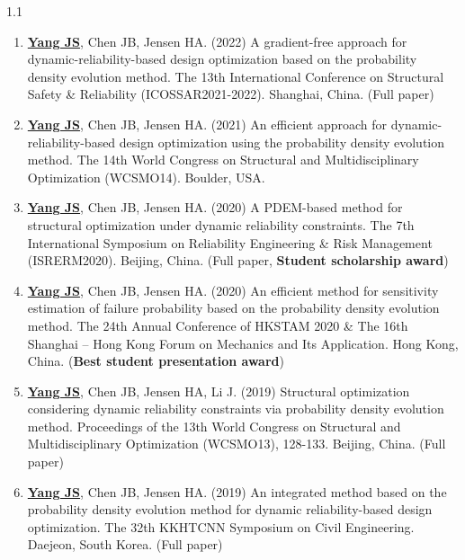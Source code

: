 \documentclass{resume}
\begin{document}
\begin{spacing}{1.1}
\begin{enumerate}[itemsep=3pt,topsep=2pt]
  \item \underline{\textbf{Yang JS}}, Chen JB, Jensen HA. (2022) A gradient-free approach for dynamic-reliability-based design optimization based on the probability density evolution method. The 13th International Conference on Structural Safety \& Reliability (ICOSSAR2021-2022). Shanghai, China. (Full paper)

  \item \underline{\textbf{Yang JS}}, Chen JB, Jensen HA. (2021) An efficient approach for dynamic-reliability-based design optimization using the probability density evolution method. The 14th World Congress on Structural and Multidisciplinary Optimization (WCSMO14). Boulder, USA.
  
  \item \underline{\textbf{Yang JS}}, Chen JB, Jensen HA. (2020) A PDEM-based method for structural optimization under dynamic reliability constraints. The 7th International Symposium on Reliability Engineering \& Risk Management (ISRERM2020). Beijing, China. (Full paper, \textbf{Student scholarship award})
  
  \item \underline{\textbf{Yang JS}}, Chen JB, Jensen HA. (2020) An efficient method for sensitivity estimation of failure probability based on the probability density evolution method. The 24th Annual Conference of HKSTAM 2020 \& The 16th Shanghai – Hong Kong Forum on Mechanics and Its Application. Hong Kong, China. (\textbf{Best student presentation award})
    
  \item \underline{\textbf{Yang JS}}, Chen JB, Jensen HA, Li J. (2019) Structural optimization considering dynamic reliability constraints via probability density evolution method. Proceedings of the 13th World Congress on Structural and Multidisciplinary Optimization (WCSMO13), 128-133. Beijing, China. (Full paper)
  
  \item \underline{\textbf{Yang JS}}, Chen JB, Jensen HA. (2019) An integrated method based on the probability density evolution method for dynamic reliability-based design optimization. The 32th KKHTCNN Symposium on Civil Engineering. Daejeon, South Korea. (Full paper)
\end{enumerate} 
\end{spacing}
\end{document}
